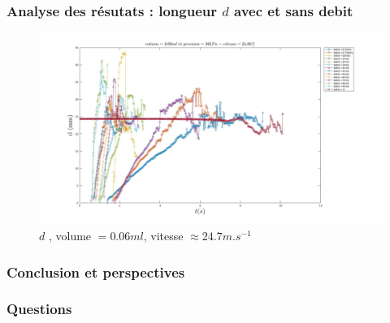 \documentclass{beamer}
\begin{document}
\begin{frame}
\frametitle{Analyse des résutats : longueur $d$ avec et sans debit}
\begin{figure}[!ht]
        \centering
	\includegraphics[width = \linewidth]{./image/p=365_vol=006d.jpg}
	\caption{$d$ , volume $= 0.06ml$, vitesse $\approx 24.7m.s^{-1}$}
\label{fig:p=365_vol=006d}
\end{figure}
\end{frame}

\begin{frame}
\frametitle{Conclusion et perspectives}
\end{frame}

\begin{frame}
\frametitle{Questions}
\end{frame}
\end{document}
